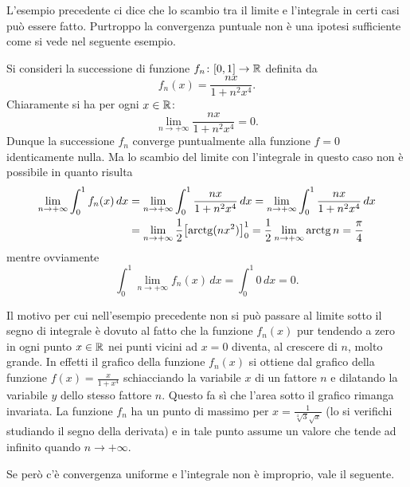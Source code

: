 L'esempio precedente ci dice che lo scambio tra il limite e l'integrale in certi casi 
può essere fatto. Purtroppo la convergenza puntuale non è una ipotesi sufficiente 
come si vede nel seguente esempio.

\begin{example}
Si consideri la successione di funzione $f_n\colon[0,1]\to{\mathbb R}$ definita da 
\[
 f_n(x) = \frac{nx}{1+n^2x^4}.  
\]
Chiaramente si ha per ogni $x\in {\mathbb R}$:
\[
  \lim_{n\to+\infty} \frac{nx}{1+n^2x^4} = 0.
\]
Dunque la successione $f_n$ converge puntualmente alla funzione $f=0$ identicamente nulla.
Ma lo scambio del limite con l'integrale in questo caso 
non è possibile in quanto risulta 
\begin{align*}
\lim_{n\to +\infty} \int_0^1 f_n(x)\, dx 
&= \lim_{n\to +\infty} \int_0^1 \frac{nx}{1+n^2x^4}\, dx 
 = \lim_{n\to +\infty} \int_0^1 \frac{nx}{1+n^2x^4}\, dx \\
&=\lim_{n\to +\infty} \frac 1 2 {\left[ \operatorname{arctg}(nx^2) \right]}_0^1 
 = \frac 1 2 \lim_{n\to +\infty} \operatorname{arctg} n = \frac \pi 4 
\end{align*}
mentre ovviamente 
\[
 \int_0^1 \lim_{n\to +\infty} f_n(x)\, dx = \int_0^1 0\, dx = 0.
\]
\end{example}

Il motivo per cui nell'esempio precedente non si può passare 
al limite sotto il segno di integrale è dovuto al fatto che la funzione 
$f_n(x)$ pur tendendo a zero in ogni punto $x\in {\mathbb R}$ nei punti vicini 
ad $x=0$ diventa, al crescere di $n$, molto grande.
In effetti il grafico della funzione $f_n(x)$ si ottiene dal grafico 
della funzione $f(x) = \frac{x}{1+x^4}$ schiacciando la variabile $x$ 
di un fattore $n$ e dilatando la variabile $y$ dello stesso fattore $n$.
Questo fa sì che l'area sotto il grafico rimanga invariata.
La funzione $f_n$ ha un punto di massimo per $x=\frac{1}{\sqrt[4]3 \sqrt x}$
(lo si verifichi studiando il segno della derivata) e in tale 
punto assume un valore che tende ad infinito quando $n\to +\infty$.

Se però c'è convergenza uniforme e l'integrale non è improprio, 
vale il seguente.

